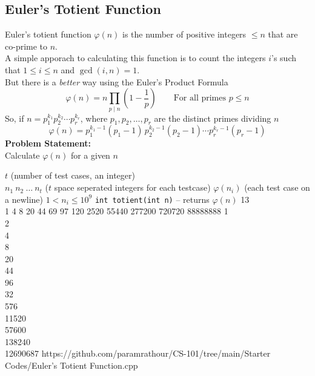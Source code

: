 \documentclass[../../Problems]{subfiles}
\begin{document}
\subsection{Euler's Totient Function}\label{pp:eulertotient}
Euler's totient function $\varphi(n)$ is the number of positive integers $\leq n$ that are co-prime to $n$.\\
A simple apporach to calculating this function is to count the integers $i$'s such that $1\leq i\leq n$ and $\gcd(i,n) = 1$.\\
But there is a \emph{better} way using the Euler's Product Formula
\begin{equation}
	\varphi (n)=n\prod _{p\mid n}\left(1-{\frac {1}{p}}\right)\qquad\text{For all primes $p\leq n$}
\end{equation}
So, if  ${\displaystyle n=p_{1}^{k_{1}}p_{2}^{k_{2}}\cdots p_{r}^{k_{r}}}$, where ${\displaystyle p_{1},p_{2},\ldots ,p_{r}}$ are the distinct primes dividing $n$
\begin{equation*}
	{\displaystyle \varphi (n)=p_{1}^{k_{1}-1}(p_{1}{-}1)\,p_{2}^{k_{2}-1}(p_{2}{-}1)\cdots p_{r}^{k_{r}-1}(p_{r}{-}1)}
\end{equation*}
\textbf{Problem Statement:}\\
Calculate $\varphi(n)$ for a given $n$

\begin{testcasesFunction}
	{$t$ \hfill(number of test cases, an integer)\\
	$n_1\ n_2\ \ldots\ n_t$ \hfill($t$ space seperated integers for each testcase)}
	{$\varphi(n_i)$ \hfill(each test case on a newline)}
	{$1 < n_i \leq 10^{9}$}
	{\texttt{int totient(int n)} -- returns $\varphi(n)$}
	{13\\1 4 8 20 44 69 97 120 2520 55440 277200 720720 88888888}
	{1\\2\\4\\8\\20\\44\\96\\32\\576\\11520\\57600\\138240\\12690687}
	{https://github.com/paramrathour/CS-101/tree/main/Starter Codes/Euler's Totient Function.cpp}
\end{testcasesFunction}
\end{document}
